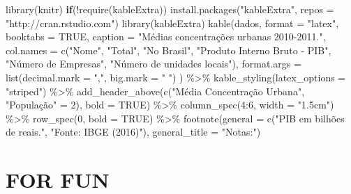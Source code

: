 \documentclass[
	12pt,				%
	oneside,			%
	a4paper,			%
	chapter=TITLE,		%
	section=TITLE,		%
	english,			%
	brazil				%
	]{abntex2}
\newenvironment{Shaded}{\begin{snugshade}}{\end{snugshade}}
\newcommand{\AttributeTok}[1]{\textcolor[rgb]{0.77,0.63,0.00}{#1}}
\newcommand{\ConstantTok}[1]{\textcolor[rgb]{0.00,0.00,0.00}{#1}}
\newcommand{\ControlFlowTok}[1]{\textcolor[rgb]{0.13,0.29,0.53}{\textbf{#1}}}
\newcommand{\DecValTok}[1]{\textcolor[rgb]{0.00,0.00,0.81}{#1}}
\newcommand{\FunctionTok}[1]{\textcolor[rgb]{0.00,0.00,0.00}{#1}}
\newcommand{\NormalTok}[1]{#1}
\newcommand{\OtherTok}[1]{\textcolor[rgb]{0.56,0.35,0.01}{#1}}
\newcommand{\SpecialCharTok}[1]{\textcolor[rgb]{0.00,0.00,0.00}{#1}}
\newcommand{\StringTok}[1]{\textcolor[rgb]{0.31,0.60,0.02}{#1}}
\begin{document}
\begin{Shaded}
\begin{Highlighting}[]
\FunctionTok{library}\NormalTok{(knitr)}
\ControlFlowTok{if}\NormalTok{(}\SpecialCharTok{!}\FunctionTok{require}\NormalTok{(kableExtra))}
  \FunctionTok{install.packages}\NormalTok{(}\StringTok{"kableExtra"}\NormalTok{, }\AttributeTok{repos =} \StringTok{"http://cran.rstudio.com"}\NormalTok{)}
\FunctionTok{library}\NormalTok{(kableExtra)}
\FunctionTok{kable}\NormalTok{(dados, }\AttributeTok{format =} \StringTok{"latex"}\NormalTok{, }\AttributeTok{booktabs =} \ConstantTok{TRUE}\NormalTok{,}
      \AttributeTok{caption =} \StringTok{"Médias concentrações urbanas 2010{-}2011."}\NormalTok{,}
      \AttributeTok{col.names =} \FunctionTok{c}\NormalTok{(}\StringTok{"Nome"}\NormalTok{, }\StringTok{"Total"}\NormalTok{, }\StringTok{"No Brasil"}\NormalTok{, }\StringTok{"Produto Interno Bruto {-} PIB"}\NormalTok{, }
                    \StringTok{"Número de Empresas"}\NormalTok{, }\StringTok{"Número de unidades locais"}\NormalTok{),}
      \AttributeTok{format.args =} \FunctionTok{list}\NormalTok{(}\AttributeTok{decimal.mark =} \StringTok{","}\NormalTok{, }\AttributeTok{big.mark =} \StringTok{" "}\NormalTok{)}
\NormalTok{    ) }\SpecialCharTok{\%\textgreater{}\%}
  \FunctionTok{kable\_styling}\NormalTok{(}\AttributeTok{latex\_options =} \StringTok{"striped"}\NormalTok{) }\SpecialCharTok{\%\textgreater{}\%} 
  \FunctionTok{add\_header\_above}\NormalTok{(}\FunctionTok{c}\NormalTok{(}\StringTok{"Média Concentração Urbana"}\NormalTok{, }\StringTok{"População"} \OtherTok{=} \DecValTok{2}\NormalTok{), }
                   \AttributeTok{bold =} \ConstantTok{TRUE}\NormalTok{) }\SpecialCharTok{\%\textgreater{}\%} 
  \FunctionTok{column\_spec}\NormalTok{(}\DecValTok{4}\SpecialCharTok{:}\DecValTok{6}\NormalTok{, }\AttributeTok{width =} \StringTok{"1.5cm"}\NormalTok{) }\SpecialCharTok{\%\textgreater{}\%} 
  \FunctionTok{row\_spec}\NormalTok{(}\DecValTok{0}\NormalTok{, }\AttributeTok{bold =} \ConstantTok{TRUE}\NormalTok{) }\SpecialCharTok{\%\textgreater{}\%} 
  \FunctionTok{footnote}\NormalTok{(}\AttributeTok{general =} \FunctionTok{c}\NormalTok{(}\StringTok{"PIB em bilhões de reais."}\NormalTok{, }\StringTok{"Fonte: IBGE (2016)"}\NormalTok{),}
           \AttributeTok{general\_title =} \StringTok{"Notas:"}\NormalTok{)}
\end{Highlighting}
\end{Shaded}
\hypertarget{appendix-b}{%
\chapter{FOR FUN}\label{appendix-b}}
\end{document}
